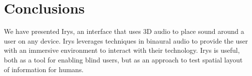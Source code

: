 \newpage                                                  \chapter{Conclusions}

We have presented Irys, an interface that uses 3D audio to place sound around a
user on any device. Irys leverages techniques in binaural audio to provide the
user with an immersive environment to interact with their technology. Irys is
useful, both as a tool for enabling blind users, but as an approach to test
spatial layout of information for humans.



\newpage                                                  {}

